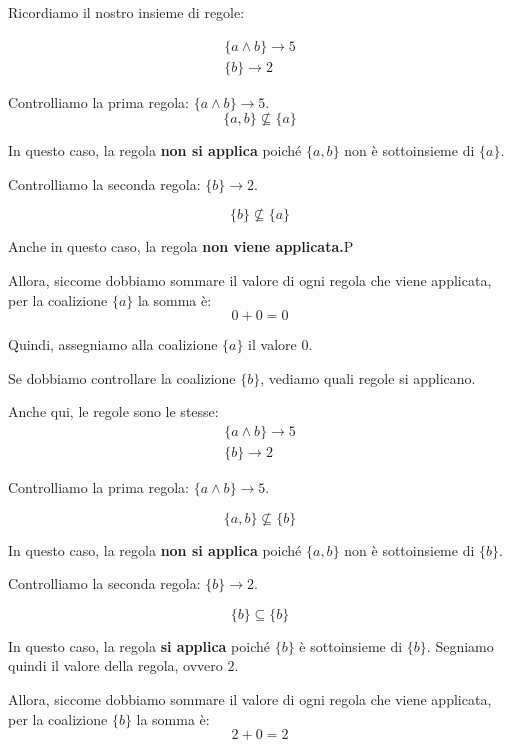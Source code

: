 Ricordiamo il nostro insieme di regole:

\[
    \begin{aligned}
        \{a \land b\} \rightarrow 5 \\
        \{b\} \rightarrow 2
    \end{aligned}
\]

Controlliamo la prima regola: $\{a \land b\} \rightarrow 5$.
\[
    \{a,b\} \nsubseteq \{a\}
\]

In questo caso, la regola \textbf{non si applica} poiché $\{a,b\}$ non è sottoinsieme di
$\{a\}$. 

Controlliamo la seconda regola: $\{b\} \rightarrow 2$.

\[
    \{b\} \nsubseteq \{a\}    
\]

Anche in questo caso, la regola \textbf{non viene applicata.}P

Allora, siccome dobbiamo sommare il valore di ogni regola che viene applicata, per la coalizione $\{a\}$ la somma è:
\[
    0+0 = 0    
\]

Quindi, assegniamo alla coalizione $\{a\}$ il valore $0$.

\begin{esempio}
\end{esempio}

Se dobbiamo controllare la coalizione $\{b\}$, vediamo quali regole si
applicano.

Anche qui, le regole sono le stesse:
\[
    \begin{aligned}
        \{a \land b\} \rightarrow 5 \\
        \{b\} \rightarrow 2
    \end{aligned}
\]

Controlliamo la prima regola: $\{a \land b\} \rightarrow 5$.

\[
    \{a,b\} \nsubseteq \{b\}
\]

In questo caso, la regola \textbf{non si applica} poiché $\{a,b\}$ non è sottoinsieme di
$\{b\}$.

Controlliamo la seconda regola: $\{b\} \rightarrow 2$.

\[
    \{b\} \subseteq \{b\}
\]

In questo caso, la regola \textbf{si applica} poiché $\{b\}$ è sottoinsieme di
$\{b\}$. Segniamo quindi il valore della regola, ovvero $2$.

Allora, siccome dobbiamo sommare il valore di ogni regola che viene applicata, per la coalizione $\{b\}$ la somma è:
\[
    2 + 0 = 2
\]


